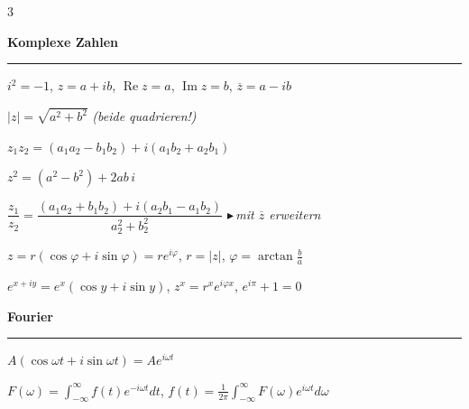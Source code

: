 \documentclass[10pt,a4paper]{article}
\newcommand{\Sec}[1]{\par\addvspace{5pt}%
  {\color{head}\large\bfseries #1}\par\vspace{-1.5pt}%
  {\color{head}\rule{\columnwidth}{0.9pt}}\par\vspace{1.5pt}}
\newcommand{\rec}[1]{{\color{vgcol}\footnotesize$\blacktriangleright$}\,{\color{grau}\itshape #1}}
\newcommand{\hint}[1]{{\color{grau}\itshape #1}}
\begin{document}
\begin{multicols}{3}
\Sec{Komplexe Zahlen}
$i^2=-1$, \;$z=a+ib$, \;$\operatorname{Re}z=a$, \;$\operatorname{Im}z=b$, \;$\overline z=a-ib$\par
$|z|=\sqrt{a^2+b^2}$ \hint{(beide quadrieren!)}\par
$z_1z_2=(a_1a_2-b_1b_2)+i(a_1b_2+a_2b_1)$\par
$z^2=(a^2-b^2)+2ab\,i$\par
$\dfrac{z_1}{z_2}=\dfrac{(a_1a_2+b_1b_2)+i(a_2b_1-a_1b_2)}{a_2^2+b_2^2}$ \rec{mit $\overline z$ erweitern}\par
$z=r(\cos\varphi+i\sin\varphi)=r e^{i\varphi}$, \;$r=|z|$, \;$\varphi=\arctan\tfrac ba$\par
$e^{x+iy}=e^{x}(\cos y+i\sin y)$, \;$z^x=r^x e^{i\varphi x}$, \;$e^{i\pi}+1=0$

\Sec{Fourier}
$A(\cos\omega t+i\sin\omega t)=A e^{i\omega t}$\par
$F(\omega)=\int_{-\infty}^{\infty} f(t)e^{-i\omega t}dt$, \;\;
$f(t)=\tfrac{1}{2\pi}\int_{-\infty}^{\infty}F(\omega)e^{i\omega t}d\omega$

\end{multicols}
\end{document}
